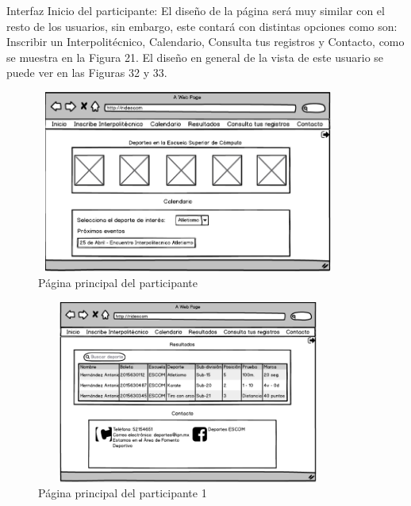 	Interfaz Inicio del participante: El diseño de la página será muy similar con el resto de los usuarios, sin embargo, este contará con distintas opciones como son: Inscribir un Interpolitécnico, Calendario, Consulta tus registros y Contacto, como se muestra en la Figura 21. El diseño en general de la vista de este usuario se puede ver en  las Figuras 32 y 33.
	\begin{figure}[hbt!]
		\centering
		\includegraphics[width=10cm, height=6cm]{Imagenes/Disenos/Inicioparticipante.png}
		\caption{Página principal del participante}
	\end{figure}
	\begin{figure}[hbt!]
		\centering
		\includegraphics[width=10cm, height=6cm]{Imagenes/Disenos/Inicioparticipante1.png}
		\caption{Página principal del participante 1}
	\end{figure}
	
